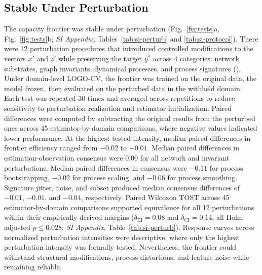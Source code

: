 \documentclass{article}
\begin{document}
\subsection*{Stable Under Perturbation}
\label{sub-sec:perturb}
The capacity frontier was stable under perturbation (Fig.~\ref{fig:tests}a, Fig.~\ref{fig:tests}b; \textit{SI Appendix}, Tables~\ref{tab:si-perturb} and \ref{tab:si-protocol}). There were 12 perturbation procedures that introduced controlled modifications to the vectors $x'$ and $z'$ while preserving the target $y^*$ across 4 categories: network substrates, graph invariants, dynamical processes, and process signatures (). Under domain-level LOGO-CV, the frontier was trained on the original data, the model frozen, then evaluated on the perturbed data in the withheld domain. Each test was repeated 30 times and averaged across repetitions to reduce sensitivity to perturbation realization and estimator initialization. Paired differences were computed by subtracting the original results from the perturbed ones across 45 estimator-by-domain comparisons, where negative values indicated lower performance. At the highest tested intensity, median paired differences in frontier efficiency ranged from $-0.02$ to $+0.01$. Median paired differences in estimation-observation consensus were 0.00 for all network and invariant perturbations. Median paired differences in consensus were $-0.11$ for process bootstrapping, $-0.02$ for process scaling, and $-0.06$ for process smoothing. Signature jitter, noise, and subset produced median consensus differences of $-0.01$, $-0.01$, and $-0.04$, respectively. Paired Wilcoxon TOST across 45 estimator-by-domain comparisons supported equivalence for all 12 perturbations within their empirically derived margins ($\delta_{\mathrm{EI}} = 0.08$ and $\delta_{\mathrm{CI}} = 0.14$, all Holm-adjusted $p \leq 0.028$; \textit{SI Appendix}, Table~\ref{tab:si-perturb}). Response curves across normalized perturbation intensities were descriptive, where only the highest perturbation intensity was formally tested. Nevertheless, the frontier could withstand structural modifications, process distortions, and feature noise while remaining reliable.
\end{document}

